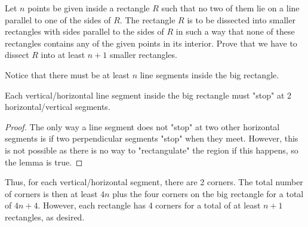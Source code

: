 \documentclass{subfile}
\begin{document}
	\begin{problem}
		Let $n$ points be given inside a rectangle $R$ such that no two of them lie on a line parallel to one of the sides of $R$. The rectangle $R$ is to be dissected into smaller rectangles with sides parallel to the sides of $R$ in such a way that none of these rectangles contains any of the given points in its interior. Prove that we have to dissect $R$ into at least $n + 1$ smaller rectangles.
	\end{problem}
	
	\begin{solution}
		Notice that there must be at least $n$ line segments inside the big rectangle.
			\begin{lemma}
				Each vertical/horizontal line segment inside the big rectangle must "stop" at 2 horizontal/vertical segments.
			\end{lemma}
			
			\begin{proof}
				The only way a line segment does not "stop" at two other horizontal segments is if two perpendicular segments "stop" when they meet. However, this is not possible as there is no way to "rectangulate" the region if this happens, so the lemma is true.
				
			\end{proof}
		Thus, for each vertical/horizontal segment, there are 2 corners. The total number of corners is then at least $4n$ plus the four corners on the big rectangle for a total of $4n+4$. However, each rectangle has 4 corners for a total of at least $n+1$ rectangles, as desired.
	\end{solution}
\end{document}
